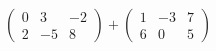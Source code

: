 $\begin{pmatrix} 0 & 3 & -2 \\ 2 & -5 & 8 \end{pmatrix}+\begin{pmatrix} 1 & -3 & 7 \\ 6 & 0 & 5 \end{pmatrix}$
